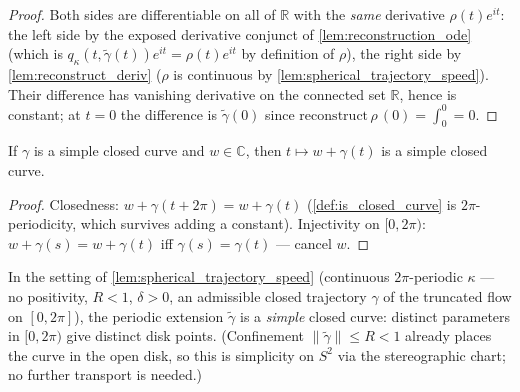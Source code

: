 \begin{proof}
  \leanok
  Both sides are differentiable on all of $\mathbb R$ with the \emph{same} derivative
  $\rho(t)e^{it}$: the left side by the exposed derivative conjunct of
  \cref{lem:reconstruction_ode} (which is $q_\kappa(t,\tilde\gamma(t))e^{it}
  =\rho(t)e^{it}$ by definition of $\rho$), the right side by
  \cref{lem:reconstruct_deriv} ($\rho$ is continuous by
  \cref{lem:spherical_trajectory_speed}). Their difference has vanishing derivative on
  the connected set $\mathbb R$, hence is constant; at $t=0$ the difference is
  $\tilde\gamma(0)$ since $\mathrm{reconstruct}\,\rho\,(0)=\int_0^0=0$.
\end{proof}

\begin{lemma}
  \label{lem:is_simple_closed_const_add}
  If $\gamma$ is a simple closed curve and $w\in\mathbb C$, then $t\mapsto w+\gamma(t)$
  is a simple closed curve.
\end{lemma}

\begin{proof}

\leanok
  Closedness: $w+\gamma(t+2\pi)=w+\gamma(t)$ (\cref{def:is_closed_curve} is
  $2\pi$-periodicity, which survives adding a constant). Injectivity on $[0,2\pi)$:
  $w+\gamma(s)=w+\gamma(t)$ iff $\gamma(s)=\gamma(t)$ — cancel $w$.
\end{proof}

\begin{lemma}\leanok
[simplicity]
  \label{lem:spherical_simplicity}
  In the setting of \cref{lem:spherical_trajectory_speed} (continuous
  $2\pi$-periodic $\kappa$ — no positivity, $R<1$, $\delta>0$, an admissible
  closed trajectory $\gamma$ of the truncated flow on
  $[0,2\pi]$), the periodic extension $\tilde\gamma$ is a \emph{simple} closed curve:
  distinct parameters in $[0,2\pi)$ give distinct disk points. (Confinement
  $\|\tilde\gamma\|\le R<1$ already places the curve in the open disk, so this is
  simplicity on $S^2$ via the stereographic chart; no further transport is needed.)
\end{lemma}

